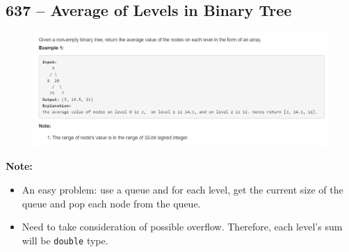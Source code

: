 \documentclass[a4paper,12pt]{article}
\begin{document}
\subsection{637 -- Average of Levels in Binary Tree}
\begin{figure}[H]
	\begin{center}
		\includegraphics[width=18cm]{637.png}
	\end{center}
\end{figure}
\textbf{\large{Note:}}
\par
\vspace{0.5em}
\begin{itemize}
	\item An easy problem: use a queue and for each level, get the current size of the queue and pop each node from the queue.
	\item Need to take consideration of possible overflow. Therefore, each level's sum will be \texttt{double} type.
\end{itemize}
\end{document}
